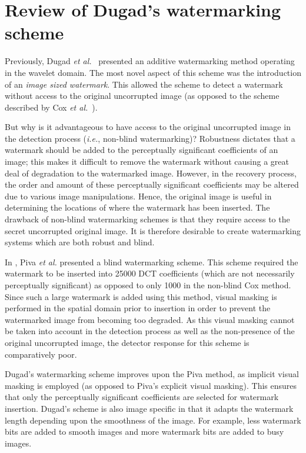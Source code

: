 \documentclass[12pt]{report}
\begin{document}
\section{Review of Dugad's watermarking scheme}
Previously, Dugad \emph{et al.}~\cite{dugadDI} presented an additive watermarking method operating 
in the wavelet domain. The most novel aspect of this scheme was the introduction of
an \emph{image sized watermark}. 
This allowed the scheme to detect a watermark without access to the original uncorrupted
image (as opposed to the scheme described by Cox \emph{et al.}~\cite{cox1}).

But why is it advantageous to have access to the original uncorrupted image in the detection process
(\emph{i.e.}, non-blind watermarking)? 
Robustness dictates that a watermark should be added to the perceptually significant 
coefficients of an image; this makes it difficult to remove the watermark without
causing a great deal of degradation to the watermarked image.
However, in the recovery process, the order and amount 
of these perceptually significant coefficients may be altered due to various image 
manipulations. Hence, the original image is useful in determining the locations of where
the watermark has been inserted.
The drawback of non-blind watermarking schemes is that they require access
to the secret uncorrupted original image. It is therefore desirable to create 
watermarking systems which are both robust and blind. 

In \cite{pivaDI}, Piva \emph{et al.} presented a blind watermarking scheme. This scheme required 
the watermark to be inserted into 25000 DCT coefficients (which are not necessarily perceptually 
significant) as opposed to only 1000 in the
non-blind Cox method. Since such a large watermark is added using this method, visual masking 
is performed in the spatial domain prior to insertion in order to prevent the 
watermarked image from becoming too degraded. As this visual masking cannot be taken into 
account in the detection process as well as the non-presence of the original uncorrupted image,
the detector response for this scheme is comparatively poor.

Dugad's watermarking scheme improves upon the Piva method, as implicit visual masking 
is employed (as opposed to Piva's explicit visual masking). This ensures that only the
perceptually significant coefficients are selected for watermark insertion. Dugad's scheme is also 
image specific in that it adapts the watermark length depending upon the smoothness of
the image. For example, less watermark bits are added to smooth images and more watermark bits are added to
busy images.
\end{document}
